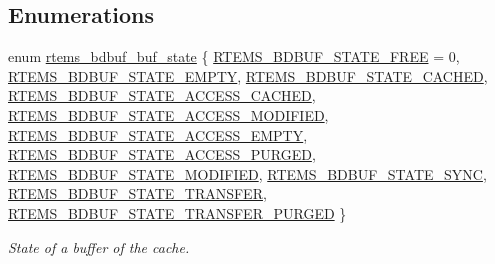 \subsection*{Enumerations}
\begin{DoxyCompactItemize}
\item 
enum \mbox{\hyperlink{group__rtems__bdbuf_ga0169f36547d36f0723b6456172eeef0a}{rtems\+\_\+bdbuf\+\_\+buf\+\_\+state}} \{ \newline
\mbox{\hyperlink{group__rtems__bdbuf_gga0169f36547d36f0723b6456172eeef0aa71f15d80aec284191be9dd7aa16ba12c}{R\+T\+E\+M\+S\+\_\+\+B\+D\+B\+U\+F\+\_\+\+S\+T\+A\+T\+E\+\_\+\+F\+R\+EE}} = 0, 
\mbox{\hyperlink{group__rtems__bdbuf_gga0169f36547d36f0723b6456172eeef0aaf20ea6300aa6f0c306411e459e346655}{R\+T\+E\+M\+S\+\_\+\+B\+D\+B\+U\+F\+\_\+\+S\+T\+A\+T\+E\+\_\+\+E\+M\+P\+TY}}, 
\mbox{\hyperlink{group__rtems__bdbuf_gga0169f36547d36f0723b6456172eeef0aac3b227c132567db236f300a26b092a69}{R\+T\+E\+M\+S\+\_\+\+B\+D\+B\+U\+F\+\_\+\+S\+T\+A\+T\+E\+\_\+\+C\+A\+C\+H\+ED}}, 
\mbox{\hyperlink{group__rtems__bdbuf_gga0169f36547d36f0723b6456172eeef0aa366b8d851fe5a11f4733c00b1409df7d}{R\+T\+E\+M\+S\+\_\+\+B\+D\+B\+U\+F\+\_\+\+S\+T\+A\+T\+E\+\_\+\+A\+C\+C\+E\+S\+S\+\_\+\+C\+A\+C\+H\+ED}}, 
\newline
\mbox{\hyperlink{group__rtems__bdbuf_gga0169f36547d36f0723b6456172eeef0aab079a61b153c4b0313bcc2a788131e02}{R\+T\+E\+M\+S\+\_\+\+B\+D\+B\+U\+F\+\_\+\+S\+T\+A\+T\+E\+\_\+\+A\+C\+C\+E\+S\+S\+\_\+\+M\+O\+D\+I\+F\+I\+ED}}, 
\mbox{\hyperlink{group__rtems__bdbuf_gga0169f36547d36f0723b6456172eeef0aa4939e1384db29ded8d98dff95580a4ed}{R\+T\+E\+M\+S\+\_\+\+B\+D\+B\+U\+F\+\_\+\+S\+T\+A\+T\+E\+\_\+\+A\+C\+C\+E\+S\+S\+\_\+\+E\+M\+P\+TY}}, 
\mbox{\hyperlink{group__rtems__bdbuf_gga0169f36547d36f0723b6456172eeef0aa4ae71d01cced39a3dc2339a68d5fdb3c}{R\+T\+E\+M\+S\+\_\+\+B\+D\+B\+U\+F\+\_\+\+S\+T\+A\+T\+E\+\_\+\+A\+C\+C\+E\+S\+S\+\_\+\+P\+U\+R\+G\+ED}}, 
\mbox{\hyperlink{group__rtems__bdbuf_gga0169f36547d36f0723b6456172eeef0aad4ad56ebb96642f2c35a59d50e04cdc8}{R\+T\+E\+M\+S\+\_\+\+B\+D\+B\+U\+F\+\_\+\+S\+T\+A\+T\+E\+\_\+\+M\+O\+D\+I\+F\+I\+ED}}, 
\newline
\mbox{\hyperlink{group__rtems__bdbuf_gga0169f36547d36f0723b6456172eeef0aa2c826ea2246ca7a4bab97a5879cbf99d}{R\+T\+E\+M\+S\+\_\+\+B\+D\+B\+U\+F\+\_\+\+S\+T\+A\+T\+E\+\_\+\+S\+Y\+NC}}, 
\mbox{\hyperlink{group__rtems__bdbuf_gga0169f36547d36f0723b6456172eeef0aa50fc56fabf62a4753588ad64aabb2c9c}{R\+T\+E\+M\+S\+\_\+\+B\+D\+B\+U\+F\+\_\+\+S\+T\+A\+T\+E\+\_\+\+T\+R\+A\+N\+S\+F\+ER}}, 
\mbox{\hyperlink{group__rtems__bdbuf_gga0169f36547d36f0723b6456172eeef0aacef35ec154e4f4fe26262af3ed685ca7}{R\+T\+E\+M\+S\+\_\+\+B\+D\+B\+U\+F\+\_\+\+S\+T\+A\+T\+E\+\_\+\+T\+R\+A\+N\+S\+F\+E\+R\+\_\+\+P\+U\+R\+G\+ED}}
 \}
\begin{DoxyCompactList}\small\item\em State of a buffer of the cache. \end{DoxyCompactList}\end{DoxyCompactItemize}

